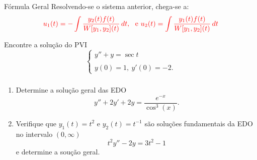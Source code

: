 \begin{frame}{Fórmula Geral}
Resolvendo-se o sistema anterior, chega-se a:
\[{\color{red}u_1(t)=-\int \frac{y_2(t)f(t)}{W[y_1,y_2](t)}\,dt,\ \text{ e } u_2(t)=\int \frac{y_1(t)f(t)}{W[y_1,y_2](t)}\,dt}\]
\begin{exe}
 Encontre a solução do PVI
 $$\left\{
 \begin{array}{l}
 y''+y=\sec t\\
 \\
 y(0)=1,\ y'(0)=-2.
 \end{array}\right.$$
 \end{exe} 
\end{frame}


\begin{frame}
\frametitle{ }
\begin{exe} 

\begin{enumerate}
\item Determine a solução geral das EDO 
\[y''+2y'+2y=\frac{e^{-x}}{\cos^3(x)}.\]
\item Verifique que $y_1(t)=t^2$ e $y_2(t)=t^{-1}$ são soluções fundamentais da EDO no intervalo $(0,\infty)$
\[t^2y''-2y=3t^2-1\]
e determine a soução geral.
\end{enumerate}
\end{exe}
\end{frame}



%
%
%
%
%
%



